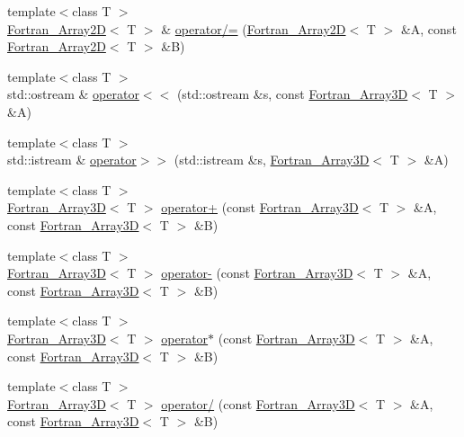 \begin{DoxyCompactItemize}
\item 
{\footnotesize template$<$class T $>$ }\\\hyperlink{classTNT_1_1Fortran__Array2D}{Fortran\+\_\+\+Array2D}$<$ T $>$ \& \hyperlink{namespaceTNT_ad8d57784747776274490334a387b5eb4}{operator/=} (\hyperlink{classTNT_1_1Fortran__Array2D}{Fortran\+\_\+\+Array2D}$<$ T $>$ \&A, const \hyperlink{classTNT_1_1Fortran__Array2D}{Fortran\+\_\+\+Array2D}$<$ T $>$ \&B)
\item 
{\footnotesize template$<$class T $>$ }\\std\+::ostream \& \hyperlink{namespaceTNT_a655b76bc5ba826ec55aebe56429c0d9c}{operator$<$$<$} (std\+::ostream \&s, const \hyperlink{classTNT_1_1Fortran__Array3D}{Fortran\+\_\+\+Array3D}$<$ T $>$ \&A)
\item 
{\footnotesize template$<$class T $>$ }\\std\+::istream \& \hyperlink{namespaceTNT_afe6ad6c1db12c3e36ef2fc56089d3878}{operator$>$$>$} (std\+::istream \&s, \hyperlink{classTNT_1_1Fortran__Array3D}{Fortran\+\_\+\+Array3D}$<$ T $>$ \&A)
\item 
{\footnotesize template$<$class T $>$ }\\\hyperlink{classTNT_1_1Fortran__Array3D}{Fortran\+\_\+\+Array3D}$<$ T $>$ \hyperlink{namespaceTNT_a7eb3cb2c72a4a811c26855a69d92ecfd}{operator+} (const \hyperlink{classTNT_1_1Fortran__Array3D}{Fortran\+\_\+\+Array3D}$<$ T $>$ \&A, const \hyperlink{classTNT_1_1Fortran__Array3D}{Fortran\+\_\+\+Array3D}$<$ T $>$ \&B)
\item 
{\footnotesize template$<$class T $>$ }\\\hyperlink{classTNT_1_1Fortran__Array3D}{Fortran\+\_\+\+Array3D}$<$ T $>$ \hyperlink{namespaceTNT_a673a55b86c9a9e0d59b29bf5214dd141}{operator-\/} (const \hyperlink{classTNT_1_1Fortran__Array3D}{Fortran\+\_\+\+Array3D}$<$ T $>$ \&A, const \hyperlink{classTNT_1_1Fortran__Array3D}{Fortran\+\_\+\+Array3D}$<$ T $>$ \&B)
\item 
{\footnotesize template$<$class T $>$ }\\\hyperlink{classTNT_1_1Fortran__Array3D}{Fortran\+\_\+\+Array3D}$<$ T $>$ \hyperlink{namespaceTNT_a0463d6c8ceb6ba5fe8217a0482ae7d90}{operator$\ast$} (const \hyperlink{classTNT_1_1Fortran__Array3D}{Fortran\+\_\+\+Array3D}$<$ T $>$ \&A, const \hyperlink{classTNT_1_1Fortran__Array3D}{Fortran\+\_\+\+Array3D}$<$ T $>$ \&B)
\item 
{\footnotesize template$<$class T $>$ }\\\hyperlink{classTNT_1_1Fortran__Array3D}{Fortran\+\_\+\+Array3D}$<$ T $>$ \hyperlink{namespaceTNT_ae8a226ec8d85aa84a8f321ab3556c7a0}{operator/} (const \hyperlink{classTNT_1_1Fortran__Array3D}{Fortran\+\_\+\+Array3D}$<$ T $>$ \&A, const \hyperlink{classTNT_1_1Fortran__Array3D}{Fortran\+\_\+\+Array3D}$<$ T $>$ \&B)

\end{DoxyCompactItemize}
